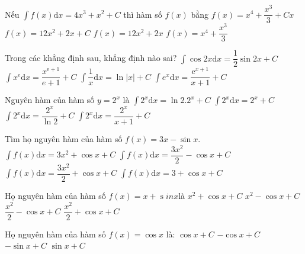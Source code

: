 \begin{ex}
	Nếu $\displaystyle\int{f(x)\mathrm{d}x=4x^3+x^2+C}$ thì hàm số $ f(x)$ bằng
	\choice
	{$ f(x)=x^4+\dfrac{x^3}{3}+Cx$}
	{$ f(x)=12x^2+2x+C$}
	{\True $ f(x)=12x^2+2x$}
	{$ f(x)=x^4+\dfrac{x^3}{3}$}
\end{ex}
\begin{ex}
	Trong các khẳng định sau, khẳng định nào sai?
	\choice
	{$\displaystyle\int{\cos 2x\mathrm{d}x=\dfrac{1}{2}\sin 2x+C}$}
	{$\displaystyle\int{x^{{e}}}\mathrm{d}x=\dfrac{x^{{\mathrm{e}}+1}}{{e}+1}+C$}
	{$\displaystyle\int{\dfrac{1}{x}\mathrm{d}x=\ln\left| x\right|}+C$}
	{\True $\displaystyle\int{{e}^x\mathrm{d}x=\dfrac{{\mathrm{e}}^{x+1}}{x+1}+C}$}
\end{ex}
\begin{ex}
	Nguyên hàm của hàm số $y=2^x$ là
	\choice
	{$\displaystyle\int{2^x\mathrm{d}x=\ln{2.2^x}+C}$}
	{$\displaystyle\int{2^x\mathrm{d}x=2^x+C}$}
	{\True $\displaystyle\int{2^x\mathrm{d}x=\dfrac{2^x}{\ln 2}+C}$}
	{$\displaystyle\int{2^x\mathrm{d}x=\dfrac{2^x}{x+1}+C}$}
\end{ex}
\begin{ex}
	Tìm họ nguyên hàm của hàm số $ f(x)=3x-\sin x$.
	\choice
	{$\displaystyle\int{f(x)}\mathrm{d}x=3x^2+\cos x+C$}
	{$\displaystyle\int{f(x)}\mathrm{d}x=\dfrac{3x^2}{2}-\cos x+C$}
	{\True $\displaystyle\int{f(x)}\mathrm{d}x=\dfrac{3x^2}{2}+\cos x+C$}
	{$\displaystyle\int{f(x)}\mathrm{d}x=3+\cos x+C$}
\end{ex}
\begin{ex}
	Họ nguyên hàm của hàm số $ f(x)=x+\operatorname{s}{inx}$là
	\choice
	{$x^2+\cos{x+C}$}
	{$x^2-\cos{x+C}$}
	{\True $\dfrac{x^2}{2}-\cos{x+C}$}
	{$\dfrac{x^2}{2}+\cos{x+C}$}
\end{ex}
\begin{ex}
	Họ nguyên hàm của hàm số $ f(x)=\cos x$ là:
	\choice
	{$\cos x+C$}
	{$-\cos x+C$}
	{$-\sin x+C$}
	{\True $\sin x+C$}
\end{ex}
